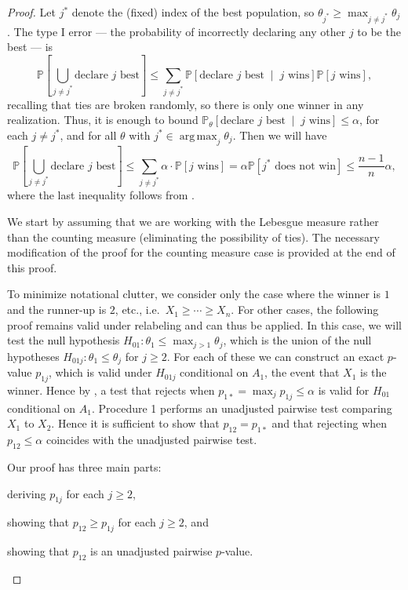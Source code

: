\documentclass[11pt]{article}
\DeclareMathOperator*{\argmax}{arg\,max}
\theoremstyle{definition}
\theoremstyle{custom}
\newcommand{\PP}{\mathbb{P}}
\begin{document}
\begin{proof}
Let $j^*$ denote the (fixed) index of the best population, so $\theta_{j^*} \ge \max_{j\neq j^*} \theta_j$. The type I error --- the probability of incorrectly declaring any other $j$ to be the best --- is
$$\PP\left[\bigcup_{j \ne j^*} \text{declare } j \text{ best}\right] \le \sum_{j \ne j^*} \PP\left[\text{declare } j \text{ best} \;\middle|\; j \text{ wins}\right] \PP\left[j \text{ wins}\right],$$
recalling that ties are broken randomly, so there is only one winner in any realization. Thus, it is enough to bound $\PP_{\theta}\left[ \text{declare } j \text{ best} \;\middle|\; j \text{ wins}\right] \le \alpha$, for each $j \ne j^*$, and for all $\theta$ with $j^* \in \argmax_j \theta_j$. Then we will have
\begin{equation}
\PP\left[\bigcup_{j \ne j^*} \text{declare } j \text{ best}\right] \le \sum_{j \ne j^*} \alpha \cdot \PP\left[j \text{ wins}\right] = \alpha \PP\left[j^* \text{ does not win}\right] \le \frac{n-1}{n} \alpha,
\label{eq:marginal}
\end{equation}
where the last inequality follows from .

We start by assuming that we are working with the Lebesgue measure rather than the counting measure (eliminating the possibility of ties). The necessary modification of the proof for the counting measure case is provided at the end of this proof.

To minimize notational clutter, we consider only the case where the winner is $1$ and the runner-up is $2$, etc., i.e.\ $X_1 \ge \cdots \ge X_n$. For other cases, the following proof remains valid under relabeling and can thus be applied. In this case, we will test the null hypothesis $H_{01}: \theta_1 \le \max_{j > 1} \theta_j$, which is the union of the null hypotheses $H_{01j}: \theta_1 \le \theta_j$ for $j \ge 2$. For each of these we can construct an exact $p$-value $p_{1j}$, which is valid under $H_{01j}$ conditional on $A_1$, the event that $X_1$ is the winner. Hence by , a test that rejects when $p_{1*} = \max_j p_{1j} \le \alpha$ is valid for $H_{01}$ conditional on $A_1$. Procedure 1 performs an unadjusted pairwise test comparing $X_1$ to $X_2$. Hence it is sufficient to show that $p_{12} = p_{1*}$ and that rejecting when $p_{12}\le \alpha$ coincides with the unadjusted pairwise test.

Our proof has three main parts:
\begin{inlinelist}
\item deriving $p_{1j}$ for each $j\ge 2$,
\item showing that $p_{12} \ge p_{1j}$ for each $j\ge 2$, and
\item showing that $p_{12}$ is an unadjusted pairwise $p$-value.
\end{inlinelist}


\end{proof}
\end{document}
